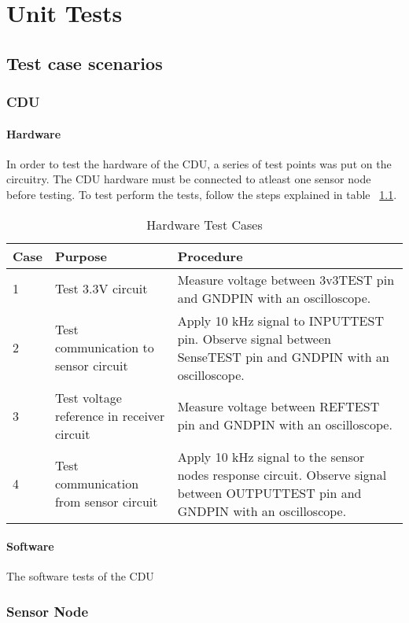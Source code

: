 \chapter{Unit Tests}

\section{Test case scenarios}
\subsection{CDU}
\subsubsection{Hardware}
\label{ch:CDUHWTEST}
In order to test the hardware of the CDU, a series of test points was put on the circuitry. The CDU hardware must be connected to atleast one sensor node before testing. To test perform the tests, follow the steps explained in table ~\ref{table:CDUHWTESTCASES}.
\begin{table}[H]
\centering
\begin{tabular}{| p{1cm} | p{4.5cm} | p{8cm} |}
\hline
Case 	&Purpose 								&Procedure\\
\hline
1 		&Test 3.3V circuit						&Measure voltage between 3v3TEST pin and GNDPIN with an oscilloscope.\\
\hline
2		&Test communication to sensor circuit	&Apply 10 kHz signal to INPUTTEST pin. Observe signal between SenseTEST pin and GNDPIN with an oscilloscope.\\
\hline
3		&Test voltage reference in receiver circuit	&Measure voltage between REFTEST pin and GNDPIN with an oscilloscope.\\
\hline
4		&Test communication from sensor circuit	&Apply 10 kHz signal to the sensor nodes response circuit. Observe signal between OUTPUTTEST pin and GNDPIN with an oscilloscope.\\
\hline
\end{tabular}
\caption{Hardware Test Cases}
\label{table:CDUHWTESTCASES}
\end{table}

\subsubsection{Software}
The software tests of the CDU

\subsection{Sensor Node}
